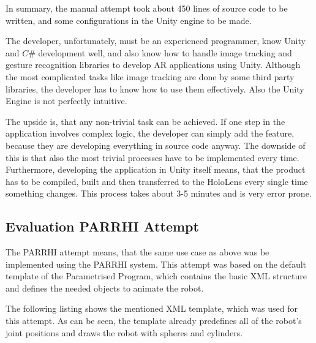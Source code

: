 In summary, the manual attempt took about 450 lines of source code to be written, and some configurations in the Unity engine to be made.

The developer, unfortunately, must be an experienced programmer, know Unity and $C\#$ development well, and also know how to handle image tracking and gesture recognition libraries to develop AR applications using Unity. Although the most complicated tasks like image tracking are done by some third party libraries, the developer has to know how to use them effectively. Also the Unity Engine is not perfectly intuitive.

The upside is, that any non-trivial task can be achieved. If one step in the application involves complex logic, the developer can simply add the feature, because they are developing everything in source code anyway. The downside of this is that also the most trivial processes have to be implemented every time. Furthermore, developing the application in Unity itself means, that the product has to be compiled, built and then transferred to the HoloLens every single time something changes. This process takes about 3-5 minutes and is very error prone.

\subsection{Evaluation PARRHI Attempt}
The PARRHI attempt means, that the same use case as above was be implemented using the PARRHI system. This attempt was based on the default template of the Parametrised Program, which contains the basic XML structure and defines the needed objects to animate the robot.

The following listing shows the mentioned XML template, which was used for this attempt. As can be seen, the template already predefines all of the robot's joint positions and draws the robot with spheres and cylinders.

